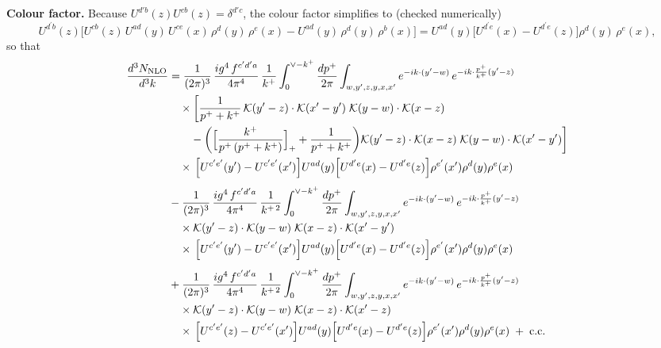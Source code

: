 \documentclass[9pt]{article}
\numberwithin{equation}{section}
\begin{document}
\textbf{Colour factor.} Because $U^{d'b}(z)U^{cb}(z)=\delta^{d'c}$, the colour factor simplifies to (checked numerically)
\begin{equation}
U^{d^{\prime}b}(z)\Big[U^{cb}(z)\,U^{ad}(y)\,U^{ce}(x)\,\rho^{d}(y)\,\rho^{e}(x)-U^{ad}(y)\,\rho^{d}(y)\,\rho^{b}(x)\Big]=U^{ad}(y)\Big[U^{d^{\prime}e}(x)-U^{d^{\prime}e}(z)\Big]\rho^{d}(y)\,\rho^{e}(x),
\end{equation}
so that
\begin{align}
\frac{d^{3}N_{\rm NLO}}{d^{3}k}&=\frac{1}{(2\pi)^{3}}\,\frac{ig^{4}\,f^{c^{\prime}d^{\prime}a}}{4\pi^{4}}\,\frac{1}{k^{+}}\int_{0}^{\vee-k^{+}}\frac{dp^{+}}{2\pi}\int_{w,y^{\prime},z,y,x,x^{\prime}}e^{-ik\cdot(y^{\prime}-w)}\,e^{-ik\cdot\frac{p^{+}}{k^{+}}(y^{\prime}-z)}\notag\\&\quad\times\bigg[\frac{1}{p^{+}+k^{+}}\,\mathcal{K}(y^{\prime}-z)\cdot\mathcal{K}(x^{\prime}-y^{\prime})\;\mathcal{K}(y-w)\cdot\mathcal{K}(x-z)\notag\\&\qquad-\bigg(\Big[\frac{k^{+}}{p^{+}\,(p^{+}+k^{+})}\Big]_{+}+\frac{1}{p^{+}+k^{+}}\bigg)\mathcal{K}(y^{\prime}-z)\cdot\mathcal{K}(x-z)\;\mathcal{K}(y-w)\cdot\mathcal{K}(x^{\prime}-y^{\prime})\bigg]\notag\\&\quad\times\,\Big[U^{c^{\prime}e^{\prime}}(y^{\prime})-U^{c^{\prime}e^{\prime}}(x^{\prime})\Big]U^{ad}(y)\Big[U^{d^{\prime}e}(x)-U^{d^{\prime}e}(z)\Big]\rho^{e^{\prime}}(x^{\prime})\rho^{d}(y)\rho^{e}(x)\notag\\[4pt]&-\frac{1}{(2\pi)^{3}}\,\frac{ig^{4}\,f^{c^{\prime}d^{\prime}a}}{4\pi^{4}}\,\frac{1}{k^{+\,2}}\int_{0}^{\vee-k^{+}}\frac{dp^{+}}{2\pi}\int_{w,y^{\prime},z,y,x,x^{\prime}}e^{-ik\cdot(y^{\prime}-w)}\,e^{-ik\cdot\frac{p^{+}}{k^{+}}(y^{\prime}-z)}\notag\\&\quad\times\mathcal{K}(y^{\prime}-z)\cdot\mathcal{K}(y-w)\;\mathcal{K}(x-z)\cdot\mathcal{K}(x^{\prime}-y^{\prime})\notag\\&\quad\times\,\Big[U^{c^{\prime}e^{\prime}}(y^{\prime})-U^{c^{\prime}e^{\prime}}(x^{\prime})\Big]U^{ad}(y)\Big[U^{d^{\prime}e}(x)-U^{d^{\prime}e}(z)\Big]\rho^{e^{\prime}}(x^{\prime})\rho^{d}(y)\rho^{e}(x)\notag\\[4pt]&+\frac{1}{(2\pi)^{3}}\,\frac{ig^{4}\,f^{c^{\prime}d^{\prime}a}}{4\pi^{4}}\,\frac{1}{k^{+\,2}}\int_{0}^{\vee-k^{+}}\frac{dp^{+}}{2\pi}\int_{w,y^{\prime},z,y,x,x^{\prime}}e^{-ik\cdot(y^{\prime}-w)}\,e^{-ik\cdot\frac{p^{+}}{k^{+}}(y^{\prime}-z)}\notag\\&\quad\times\mathcal{K}(y^{\prime}-z)\cdot\mathcal{K}(y-w)\;\mathcal{K}(x-z)\cdot\mathcal{K}(x^{\prime}-z)\notag\\&\quad\times\,\Big[U^{c^{\prime}e^{\prime}}(z)-U^{c^{\prime}e^{\prime}}(x^{\prime})\Big]U^{ad}(y)\Big[U^{d^{\prime}e}(x)-U^{d^{\prime}e}(z)\Big]\rho^{e^{\prime}}(x^{\prime})\rho^{d}(y)\rho^{e}(x)\;+\;{\rm c.c.}
\end{align}
\end{document}
